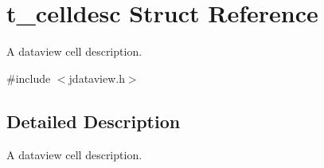 \hypertarget{structt__celldesc}{
\section{t\_\-celldesc Struct Reference}
\label{structt__celldesc}
}


A dataview cell description.  


{\ttfamily \#include $<$jdataview.h$>$}

\subsection{Detailed Description}
A dataview cell description. 